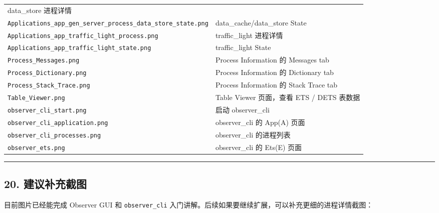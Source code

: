 \begin{longtable}[]{@{}
  >{\raggedright\arraybackslash}p{}
  >{\raggedright\arraybackslash}p{}@{}}
data\_store 进程详情 \\
\texttt{Applications\_app\_gen\_server\_process\_data\_store\_state.png}
& data\_cache/data\_store State \\
\texttt{Applications\_app\_traffic\_light\_process.png} & traffic\_light
进程详情 \\
\texttt{Applications\_app\_traffic\_light\_state.png} & traffic\_light
State \\
\texttt{Process\_Messages.png} & Process Information 的 Messages tab \\
\texttt{Process\_Dictionary.png} & Process Information 的 Dictionary
tab \\
\texttt{Process\_Stack\_Trace.png} & Process Information 的 Stack Trace
tab \\
\texttt{Table\_Viewer.png} & Table Viewer 页面，查看 ETS / DETS
表数据 \\
\texttt{observer\_cli\_start.png} & 启动 observer\_cli \\
\texttt{observer\_cli\_application.png} & observer\_cli 的 App(A)
页面 \\
\texttt{observer\_cli\_processes.png} & observer\_cli 的进程列表 \\
\texttt{observer\_ets.png} & observer\_cli 的 Ets(E) 页面 \\
\end{longtable}

\begin{center}\rule{0.5\linewidth}{0.5pt}\end{center}

\subsection{20.
建议补充截图}\label{ux5efaux8baeux8865ux5145ux622aux56fe}

目前图片已经能完成 Observer GUI 和 \texttt{observer\_cli}
入门讲解。后续如果要继续扩展，可以补充更细的进程详情截图：

